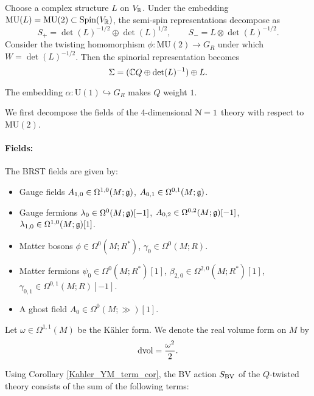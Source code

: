\documentclass[10pt, oneside]{article}
\newcommand{\MU}{\mathrm{MU}}
\renewcommand{\U}{\mathrm{U}}
\begin{document}
Choose a complex structure $L$ on $V_\mathbb R$. Under the embedding $\MU(L) = \MU(2) \subset \Spin(V_\RR)$, the semi-spin representations decompose as
\[
S_+ = \det(L)^{-1/2} \oplus \det(L)^{1/2},\qquad S_- = L \otimes \det(L)^{-1/2} .
\]
Consider the twisting homomorphism $\phi\colon\MU(2)\rightarrow G_R$ under which $W = \det(L)^{-1/2}$. Then the spinorial representation becomes
\[\Sigma = (\mathbb C Q\oplus \det(L)^{-1})\oplus L.\]

The embedding $\alpha\colon \U(1)\hookrightarrow G_R$ makes $Q$ weight $1$.

We first decompose the fields of the 4-dimensional $\mathcal{N}=1$ theory with respect to $\MU(2)$.
\vspace{-10pt}
\paragraph{Fields:} The BRST fields are given by:
\begin{itemize}
\item Gauge fields $A_{1, 0} \in \Omega^{1, 0}(M; \mathfrak g)$, $A_{0, 1}\in\Omega^{0, 1}(M; \mathfrak g)$.
\item Gauge fermions $\lambda_0\in\Omega^0(M; \mathfrak g)[-1]$, $A_{0, 2}\in\Omega^{0, 2}(M; \mathfrak g)[-1]$, $\lambda_{1, 0}\in\Omega^{1, 0}(M; \mathfrak g)[1]$.
\item Matter bosons $\phi\in\Omega^0(M; R^*)$, $\gamma_0\in\Omega^0(M; R)$.
\item Matter fermions $\psi_0\in\Omega^0(M; R^*)[1]$, $\beta_{2, 0}\in\Omega^{2, 0}(M; R^*)[1]$, $\gamma_{0, 1}\in\Omega^{0, 1}(M; R)[-1]$.
\item A ghost field $A_0\in \Omega^0(M; \gg)[1]$.
\end{itemize}

Let $\omega\in\Omega^{1, 1}(M)$ be the K\"ahler form. We denote the real volume form on $M$ by
\[\operatorname{dvol} = \frac{\omega^2}{2}.\]

Using Corollary \ref{Kahler_YM_term_cor}, the BV action $S_{\mathrm{BV}}$ of the $Q$-twisted theory consists of the sum of the following terms:
\end{document}
